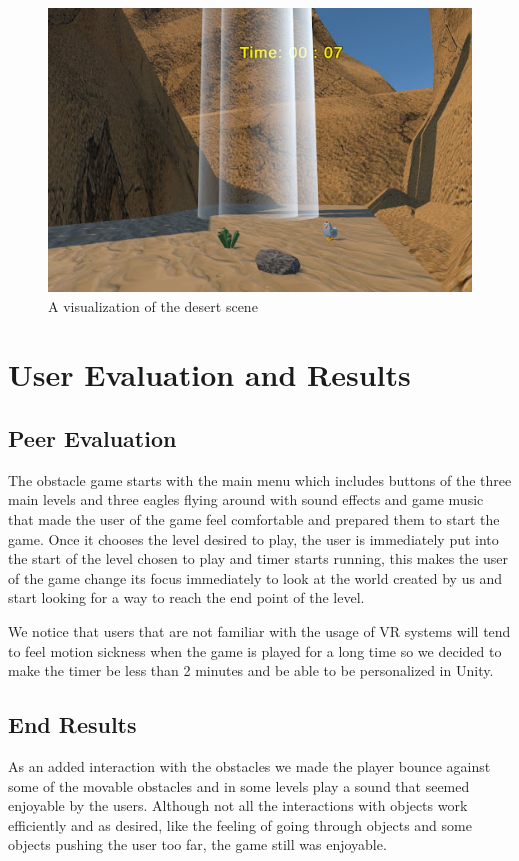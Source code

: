 \documentclass{vgtc}                          %
\begin{document}
\begin{figure}[tb]
  \centering %
  \includegraphics[width=\columnwidth]{desert2.jpg}
  \caption{A visualization of the desert scene}
 \end{figure}
\section{User Evaluation and Results}
\subsection{Peer Evaluation}
The obstacle game starts with the main menu which includes buttons of the three main levels and three eagles flying around with sound effects and game music that made the user of the game feel comfortable and prepared them to start the game. Once it chooses the level desired to play, the user is immediately put into the start of the level chosen to play and timer starts running, this makes the user of the game  change its focus immediately to look at the world created by us and start looking for a way to reach the end point of the level.

We notice that users that are not familiar with the usage of VR systems will tend to feel motion sickness when the game is played for a long time so we decided to make the timer be less than 2 minutes and be able to be personalized in Unity.

\subsection{End Results}
As an added interaction with the obstacles we made the player bounce against some of the movable obstacles and in some levels play a sound that seemed enjoyable by the users. Although not all the interactions with objects work efficiently and as desired, like the feeling of going through objects and some objects pushing the user too far, the game still was enjoyable.
\end{document}
